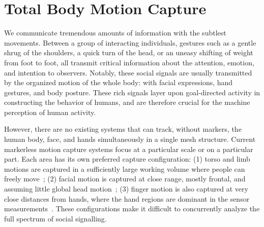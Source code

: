 
\chapter{Total Body Motion Capture}
\label{chapter:totalcapture}

We communicate tremendous amounts of information with the subtlest movements. Between a group of interacting individuals, gestures such as a gentle shrug of the shoulders, a quick turn of the head, or an uneasy shifting of weight from foot to foot, all transmit critical information about the attention, emotion, and intention to observers. Notably, these social signals are usually transmitted by the organized motion of the whole body: with facial expressions, hand gestures, and body posture. These rich signals layer upon goal-directed activity in constructing the behavior of humans, and are therefore crucial for the machine perception of human activity. 

However, there are no existing systems that can track, without markers, the human body, face, and hands simultaneously in a single mesh structure. Current markerless motion capture systems focus at a particular scale or on a particular part. Each area has its own preferred capture configuration: (1) torso and limb motions are captured in a sufficiently large working volume where people can freely move~\cite{de2008performance, Gall-09, Stoll-11, Elhayek-15}; (2) facial motion is captured at close range, mostly frontal, and assuming little global head motion~\cite{beeler2010high,ghosh2011multiview,Beeler2011, bradley2010high, valgaerts2012lightweight}; (3) finger motion is also captured at very close distances from hands, where the hand regions are dominant in the sensor measurements~\cite{Oikonomidis-12, Tompson-14a, Sridha-15, Tzionas-16}. These configurations make it difficult to concurrently analyze the full spectrum of social signalling.



